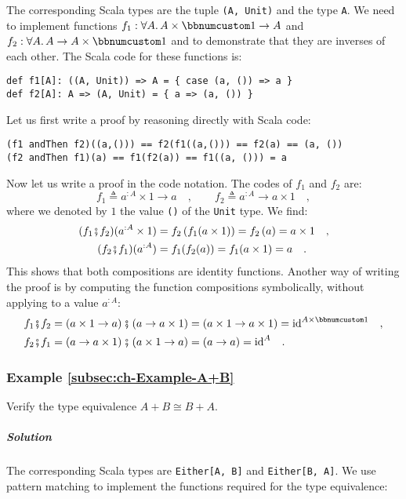 The corresponding Scala types are the tuple \lstinline!(A, Unit)!
and the type \lstinline!A!. We need to implement functions $f_{1}:\forall A.\,A\times\bbnum 1\rightarrow A$
and $f_{2}:\forall A.\,A\rightarrow A\times\bbnum 1$ and to demonstrate
that they are inverses of each other. The Scala code for these functions
is:
\begin{lstlisting}
def f1[A]: ((A, Unit)) => A = { case (a, ()) => a }
def f2[A]: A => (A, Unit) = { a => (a, ()) }
\end{lstlisting}
Let us first write a proof by reasoning directly with Scala code:
\begin{lstlisting}
(f1 andThen f2)((a,())) == f2(f1((a,())) == f2(a) == (a, ())
(f2 andThen f1)(a) == f1(f2(a)) == f1((a, ())) = a
\end{lstlisting}
Now let us write a proof in the code notation. The codes of $f_{1}$
and $f_{2}$ are:
\[
f_{1}\triangleq a^{:A}\times1\rightarrow a\quad,\quad\quad f_{2}\triangleq a^{:A}\rightarrow a\times1\quad,
\]
where we denoted by $1$ the value \lstinline!()! of the \lstinline!Unit!
type. We find:
\begin{align*}
(f_{1}\bef f_{2})(a^{:A}\times1) & =f_{2}\left(f_{1}(a\times1)\right)=f_{2}\left(a\right)=a\times1\quad,\\
(f_{2}\bef f_{1})(a^{:A}) & =f_{1}(f_{2}(a))=f_{1}(a\times1)=a\quad.
\end{align*}
This shows that both compositions are identity functions. Another
way of writing the proof is by computing the function compositions
symbolically, without applying to a value $a^{:A}$:
\begin{align*}
f_{1}\bef f_{2} & =\left(a\times1\rightarrow a\right)\bef\left(a\rightarrow a\times1\right)=\left(a\times1\rightarrow a\times1\right)=\text{id}^{A\times\bbnum 1}\quad,\\
f_{2}\bef f_{1} & =\left(a\rightarrow a\times1\right)\bef\left(a\times1\rightarrow a\right)=\left(a\rightarrow a\right)=\text{id}^{A}\quad.
\end{align*}


\subsubsection{Example \label{subsec:ch-Example-A+B}\ref{subsec:ch-Example-A+B}}

Verify the type equivalence $A+B\cong B+A$.

\subparagraph{Solution}

The corresponding Scala types are \lstinline!Either[A, B]! and \lstinline!Either[B, A]!.
We use pattern matching to implement the functions required for the
type equivalence:

